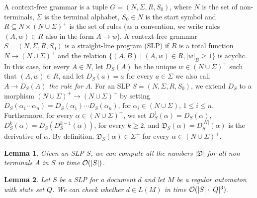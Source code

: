 \documentclass{article}
\newtheorem{lemma}{Lemma}
\begin{document}
	A context-free grammar is a tuple $G = (N,\Sigma,R,S_0)$, where $N$ is the set of non-terminals, $\Sigma$ is the terminal alphabet, $S_0\in N$ is the start symbol and $R\subseteq N \times(N \cup\Sigma)^{+}$ is the set of rules (as a convention, we write rules $(A,w) \in R$ also in the form $A\to w$). A context-free grammar $S = (N,\Sigma,R,S_0)$ is a straight-line
program (SLP) if $R$ is a total function $N\to(N \cup\Sigma)^{+}$ and the relation $\{(A,B)\mid (A,w) \in R, |w|_B \geq 1\}$ is acyclic. In this case, for every $A \in N$, let $D_S(A)$ be the unique $w \in (N \cup\Sigma)^{+}$ such that $(A,w) \in R$, and let $D_S(a) = a$ for every $a \in \Sigma$ we also call $A \to D_S(A)$ {\em the rule for} $A$. For an SLP $S = (N,\Sigma,R,S_0)$, we extend $D_S$ to a morphism $(N \cup\Sigma)^{+}\to(N \cup\Sigma)^{+}$ by setting $D_S(\alpha_1 \cdots \alpha_n) = D_S(\alpha_1) \cdots D_S(\alpha_n)$, for $\alpha_i \in (N \cup\Sigma)$, $1 \leq i \leq n$. Furthermore, for every $\alpha \in (N \cup\Sigma)^{+}$, we set $D^1_S(\alpha) = D_S(\alpha)$, $D^k_S(\alpha) =
D_S(D^{k-1}_S (\alpha))$, for every $k \geq 2$, and $\mathfrak{D}_S(\alpha) = D^{|N|}_S (\alpha)$ is the derivative of $\alpha$. By definition, $\mathfrak{D}_S(\alpha) \in \Sigma^+$ for every $\alpha \in (N \cup\Sigma)^{+}$.
	
	\begin{lemma}
		Given an SLP $S$, we can compute all the numbers $| \mathfrak{D} |$ for all non-terminals $A$ in $S$ in time ${\cal O}(|S|)$.		
	\end{lemma}

\begin{lemma}
	Let $S$ be a SLP for a document $d$ and let $M$ be a regular automaton with state set $Q$. We can check whether $d\in L(M)$ in time ${\cal O}(|S| \cdot |Q|^3)$.
\end{lemma}
	
	\newpage
	
	
	
\end{document}
